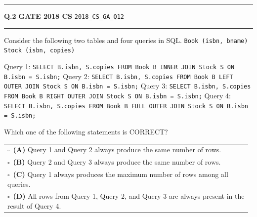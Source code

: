 \documentclass[a4paper,10pt]{article}
\begin{document}
\vspace{6pt}\hrule height 0.35pt\vspace{6pt}
\noindent
\begin{tcolorbox}[
    blanker,
    sidebyside,
    sidebyside align=top,
    lefthand width=0.55\textwidth,
    top=4pt, bottom=4pt, left=0pt, right=0pt,
    middle=16pt,
    underlay={
        \draw[dashed, black!80, line width=0.8pt, dash pattern=on 4pt off 3pt]
            ([xshift=0.55\textwidth+8pt]frame.north west) --
            ([xshift=0.55\textwidth+8pt]frame.south west);
    }
]
\textbf{Q.2}  \hfill {\footnotesize\textbf{GATE 2018 CS} \quad \tiny\texttt{2018\_CS\_GA\_Q12}}
\vspace{2pt}\hrule height 0.3pt\vspace{4pt}

Consider the following two tables and four queries in SQL.
\texttt{Book (isbn, bname)}
\texttt{Stock (isbn, copies)}
\par\medskip
Query 1: \texttt{SELECT B.isbn, S.copies FROM Book B INNER JOIN Stock S ON B.isbn = S.isbn;}
Query 2: \texttt{SELECT B.isbn, S.copies FROM Book B LEFT OUTER JOIN Stock S ON B.isbn = S.isbn;}
Query 3: \texttt{SELECT B.isbn, S.copies FROM Book B RIGHT OUTER JOIN Stock S ON B.isbn = S.isbn;}
Query 4: \texttt{SELECT B.isbn, S.copies FROM Book B FULL OUTER JOIN Stock S ON B.isbn = S.isbn;}
\par\medskip
Which one of the following statements is CORRECT?

\par\vspace{6pt}\noindent
\begin{tabular}{@{}p{0.98\linewidth}@{}}
$\square$\ \textbf{(A)} Query 1 and Query 2 always produce the same number of rows. \\
\addlinespace[3pt]
$\square$\ \textbf{(B)} Query 2 and Query 3 always produce the same number of rows. \\
\addlinespace[3pt]
$\square$\ \textbf{(C)} Query 1 always produces the maximum number of rows among all queries. \\
\addlinespace[3pt]
$\square$\ \textbf{(D)} All rows from Query 1, Query 2, and Query 3 are always present in the result of Query 4.
\end{tabular}

\tcblower


\end{tcolorbox}
\end{document}
